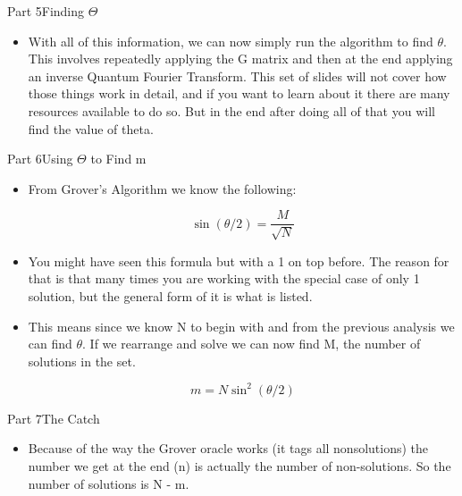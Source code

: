 \begin{frame}{Part 5}{Finding $\Theta$}
\begin{itemize}
    \item With all of this information, we can now simply run the algorithm to find $\theta$. This involves repeatedly applying the G matrix and then at the end applying an inverse Quantum Fourier Transform. This set of slides will not cover how those things work in detail, and if you want to learn about it there are many resources available to do so. But in the end after doing all of that you will find the value of theta.



\end{itemize}
\end{frame}


\begin{frame}{Part 6}{Using $\Theta$ to Find m}
\begin{itemize}
    \item From Grover's Algorithm we know the following:

    $$\sin(\theta/2) = \dfrac{M}{\sqrt{N}}$$

    \item You might have seen this formula but with a 1 on top before. The reason for that is that many times you are working with the special case of only 1 solution, but the general form of it is what is listed.
    \item This means since we know N to begin with and from the previous analysis we can find $\theta$. If we rearrange and solve we can now find M, the number of solutions in the set.

    $$m = N\sin^2(\theta/2)$$



\end{itemize}
\end{frame}




\begin{frame}{Part 7}{The Catch}
\begin{itemize}
    \item Because of the way the Grover oracle works (it tags all nonsolutions) the number we get at the end (n) is actually the number of non-solutions. So the number of solutions is N - m.



\end{itemize}
\end{frame}















